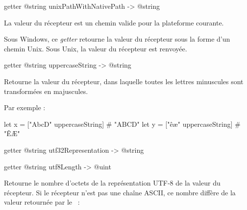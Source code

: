 \begin{galgas3box}
getter @string unixPathWithNativePath -> @string
\end{galgas3box}

La valeur du récepteur est un chemin valide pour la plateforme courante.

Sous Windows, ce \emph{getter} retourne la valeur du récepteur sous la forme d'un chemin Unix. Sous Unix, la valeur du récepteur est renvoyée.














\begin{galgas3box}
getter @string uppercaseString -> @string
\end{galgas3box}

Retourne la valeur du récepteur, dans laquelle toutes les lettres minuscules sont transformées en majuscules.

Par exemple :
\begin{galgas3}
let x = ["AbcD" uppercaseString] # "ABCD"
let y = ["êæ" uppercaseString] # "ÊÆ"
\end{galgas3}















\begin{galgas3box}
getter @string utf32Representation -> @string
\end{galgas3box}
















\begin{galgas3box}
getter @string utf8Length -> @uint
\end{galgas3box}

Retourne le nombre d'octets de la représentation UTF-8 de la valeur du récepteur. Si le récepteur n'est pas une chaîne ASCII, ce nombre diffère de la valeur retournée par le ~:

